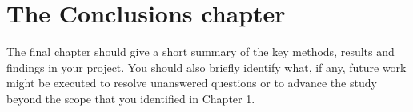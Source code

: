 \section{The Conclusions chapter}
The final chapter should give a short summary of the key methods, results and findings in your project. You should also briefly identify what, if any, future work might be executed to resolve unanswered questions or to advance the study beyond the scope that you identified in Chapter 1.
